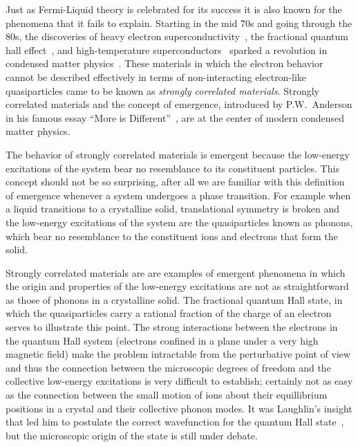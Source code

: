 \documentclass[oneside,11pt]{memoir}
\begin{document}
Just as Fermi-Liquid theory is celebrated for its success it is also known for
the phenomena that it fails to explain.   Starting in the mid 70s and going
through the 80s, the discoveries of heavy electron
superconductivity~\cite{PhysRevLett.35.1779,PhysRevLett.43.1892},  the
fractional quantum hall effect~\cite{PhysRevLett.48.1559,PhysRevLett.50.1395},
and high-temperature superconductors~\cite{Zeitschrift.64.189} sparked a
revolution in condensed matter physics~\cite{coleman2004revolution}.   These
materials in which the electron behavior cannot be described effectively in
terms of non-interacting electron-like quasiparticles came to be known as
\textit{strongly correlated materials}.   Strongly correlated  materials and
the concept of emergence, introduced by P.W.~Anderson in his famous essay
``More is Different''~\cite{Anderson1972}, are at the center of modern
condensed matter physics. 

The behavior of strongly correlated materials is emergent because the
low-energy excitations of the system bear no resemblance to its constituent
particles.  This concept should not be so surprising, after all we are familiar
with this definition of emergence whenever a system undergoes a phase
transition.  For example when a liquid transitions to a crystalline solid,
translational symmetry is broken  and the low-energy excitations of the system
are the quasiparticles known as phonons, which bear no resemblance to the
constituent ions and electrons that form the solid.   

Strongly correlated materials are are examples of emergent phenomena in which
the origin and properties of the low-energy excitations are not as
straightforward as those of phonons in a crystalline solid.  The fractional
quantum Hall state, in which the quasiparticles carry a rational fraction of
the charge of an electron serves to illustrate this point.  The strong
interactions between the electrons in the quantum Hall system (electrons
confined in a plane under a very high magnetic field) make the problem
intractable from the perturbative point of view and thus the connection between
the microscopic degrees of freedom and the collective low-energy excitations is
very difficult to establish; certainly not as easy as the connection between
the small motion of ions about their equillibrium positions in a crystal and
their collective phonon modes. It was Laughlin's insight that led him to
postulate the correct wavefunction  for the quantum Hall
state~\cite{PhysRevLett.50.1395}, but the microscopic origin of the state is
still under debate.   
\end{document}
